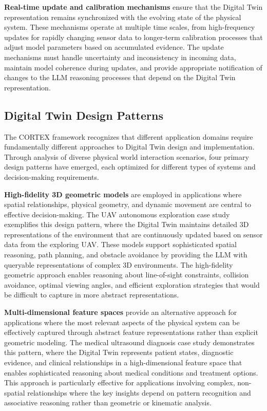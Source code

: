 \textbf{Real-time update and calibration mechanisms} ensure that the Digital Twin representation remains synchronized with the evolving state of the physical system. These mechanisms operate at multiple time scales, from high-frequency updates for rapidly changing sensor data to longer-term calibration processes that adjust model parameters based on accumulated evidence. The update mechanisms must handle uncertainty and inconsistency in incoming data, maintain model coherence during updates, and provide appropriate notification of changes to the LLM reasoning processes that depend on the Digital Twin representation.

\subsection{Digital Twin Design Patterns}

The CORTEX framework recognizes that different application domains require fundamentally different approaches to Digital Twin design and implementation. Through analysis of diverse physical world interaction scenarios, four primary design patterns have emerged, each optimized for different types of systems and decision-making requirements.

\textbf{High-fidelity 3D geometric models} are employed in applications where spatial relationships, physical geometry, and dynamic movement are central to effective decision-making. The UAV autonomous exploration case study exemplifies this design pattern, where the Digital Twin maintains detailed 3D representations of the environment that are continuously updated based on sensor data from the exploring UAV. These models support sophisticated spatial reasoning, path planning, and obstacle avoidance by providing the LLM with queryable representations of complex 3D environments. The high-fidelity geometric approach enables reasoning about line-of-sight constraints, collision avoidance, optimal viewing angles, and efficient exploration strategies that would be difficult to capture in more abstract representations.

\textbf{Multi-dimensional feature spaces} provide an alternative approach for applications where the most relevant aspects of the physical system can be effectively captured through abstract feature representations rather than explicit geometric modeling. The medical ultrasound diagnosis case study demonstrates this pattern, where the Digital Twin represents patient states, diagnostic evidence, and clinical relationships in a high-dimensional feature space that enables sophisticated reasoning about medical conditions and treatment options. This approach is particularly effective for applications involving complex, non-spatial relationships where the key insights depend on pattern recognition and associative reasoning rather than geometric or kinematic analysis.

